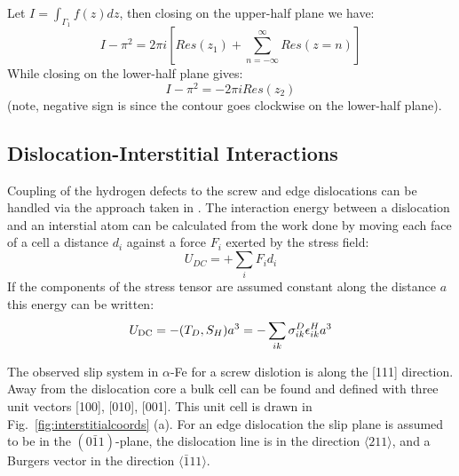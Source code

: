 Let $I=\int_{\Gamma_{1}}f(z)dz$, then closing on the upper-half plane we have:
\begin{equation}
I-\pi^{2} = 2\pi i\left[Res(z_{1})+\sum_{n=-\infty}^{\infty}Res(z=n)\right]
\end{equation}
While closing on the lower-half plane gives:
\begin{equation}
I-\pi^{2} = -2\pi i Res(z_{2})
\end{equation}
(note, negative sign is since the contour goes clockwise on the lower-half plane).

\subsection{Dislocation-Interstitial Interactions}
Coupling of the hydrogen defects to the screw and edge dislocations can be
handled via the approach taken in \cite{cochardt55}.
The interaction energy between a dislocation and an interstial atom can
be calculated from the work done by moving each face of a cell a distance
$d_{i}$ against a force $F_{i}$ exerted by the stress field:
%
\begin{equation}
U_{DC} =+\sum_{i}F_{i}d_{i}
\end{equation}
%
If the components of the stress tensor are assumed constant along the distance $a$
this energy can be written:
%
\begin{equation}
U_{\rm{DC}} = -(T_{D},S_{H})a^{3}= -\sum_{ik} \sigma_{ik}^{D}\epsilon^{H}_{ik} a^{3}
\end{equation}
%

The observed slip system in $\alpha$-Fe for a screw dislotion is along the [111]
direction. Away from the dislocation core a bulk cell can be found and defined
with three unit vectors [100], [010], [001]. This unit cell is drawn in
Fig.~\ref{fig:interstitialcoords} (a). For an edge dislocation the slip plane is
assumed to be in the $(0\bar{1}1)$-plane, the dislocation line is in the direction
$\langle 211 \rangle$, and a Burgers vector in the direction $\langle \bar{1}11 \rangle$.

